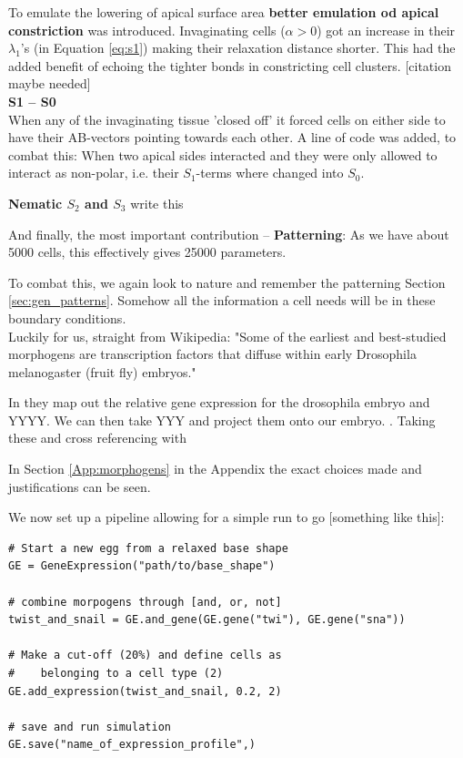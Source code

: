 To emulate the lowering of apical surface area \textbf{better emulation od apical constriction} was introduced. Invaginating cells ($\alpha > 0$) got an increase in their $\lambda_1$'s (in Equation \ref{eq:s1}) making their relaxation distance shorter. This had the added benefit of echoing the tighter bonds in constricting cell clusters. [citation maybe needed]\\

\textbf{S1 -- S0}\\
When any of the invaginating tissue 'closed off' it forced cells on either side to have their AB-vectors pointing towards each other. A line of code was added, to combat this: When two apical sides interacted and  they were only allowed to interact as non-polar, i.e. their $S_1$-terms where changed into $S_0$.


\textbf{Nematic $S_2$ and $S_3$} write this

And finally, the most important contribution -- \textbf{Patterning}:
As we have about 5000 cells, this effectively gives 25000 parameters.

To combat this, we again look to nature and remember the patterning Section \ref{sec:gen_patterns}. Somehow all the information a cell needs will be in these boundary conditions.\\
Luckily for us, straight from Wikipedia:
"Some of the earliest and best-studied morphogens are transcription factors that diffuse within early Drosophila melanogaster (fruit fly) embryos."


In \cite{shinyDVEX} they map out the relative gene expression for the drosophila embryo and YYYY. We can then take YYY and project them onto our embryo. . Taking these  and cross referencing with 

In Section \ref{App:morphogens} in the Appendix the exact choices made and justifications can be seen.

We now set up a pipeline allowing for a simple run to go [something like this]:

\begin{lstlisting}
# Start a new egg from a relaxed base shape
GE = GeneExpression("path/to/base_shape")

# combine morpogens through [and, or, not]
twist_and_snail = GE.and_gene(GE.gene("twi"), GE.gene("sna"))

# Make a cut-off (20%) and define cells as 
#    belonging to a cell type (2) 
GE.add_expression(twist_and_snail, 0.2, 2) 

# save and run simulation
GE.save("name_of_expression_profile",)

\end{lstlisting}

